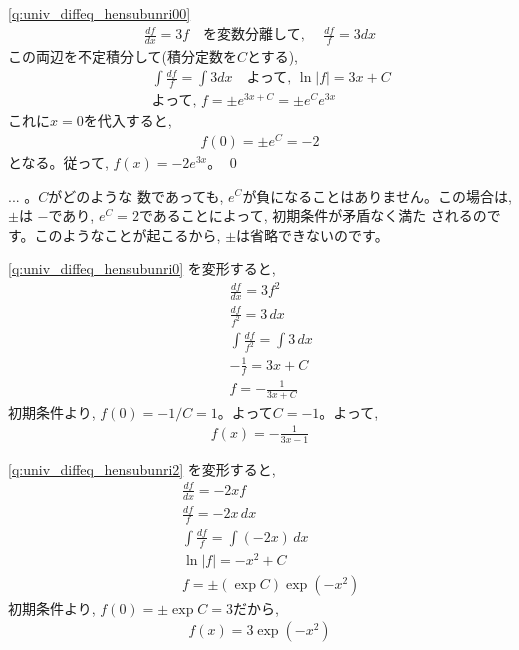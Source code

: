 \ref{q:univ_diffeq_hensubunri00} 
\begin{eqnarray*}
\frac{df}{dx}=3 f\quad
\text{を変数分離して, }\quad
\frac{df}{f}=3 dx\end{eqnarray*}
この両辺を不定積分して(積分定数を$C$とする),
\begin{eqnarray}
&&\int\frac {df}{f} = \int 3 dx\quad\text{よって, }\ln |f| = 3 x + C\nonumber\\
&&\text{よって, }f = \pm e^{3 x + C} = \pm e^C e^{3x}\label{q:univ_diffeq_hensubunri00a3}
\end{eqnarray}
これに$x=0$を代入すると, 
\begin{eqnarray}f(0) = \pm e^C=-2\label{q:univ_diffeq_hensubunri00a5}\end{eqnarray}
となる。従って, $f(x)=-2 e^{3x}$。
\qed
\begin{freqmiss}{\small{} ... 。$C$がどのような
数であっても, $e^C$が負になることはありません。この場合は, $\pm$は
$-$であり, $e^C=2$であることによって, 初期条件が矛盾なく満た
されるのです。このようなことが起こるから, $\pm$は省略できないのです。}\end{freqmiss}
\mv

\ref{q:univ_diffeq_hensubunri0} 
を変形すると, 
\begin{eqnarray}
&&\frac{df}{dx}=3f^2\label{eq:difex41}\\
&&\frac{df}{f^2}=3\,dx\label{eq:difex42}\\
&&\int\frac{df}{f^2}=\int3\,dx\label{eq:difex425}\\
&&-\frac{1}{f}=3x+C\label{eq:difex43}\\
&&f=-\frac{1}{3x+C}\label{eq:difex44}
\end{eqnarray}
初期条件より, $f(0)=-1/C=1$。よって$C=-1$。よって, 
\begin{eqnarray}
f(x)=-\frac{1}{3x-1}\label{eq:difex45}
\end{eqnarray}
\mv

\ref{q:univ_diffeq_hensubunri2} 
を変形すると, 
\begin{eqnarray}
&&\frac{df}{dx}=-2xf\label{eq:difex51}\\
&&\frac{df}{f}=-2x\,dx\label{eq:difex52}\\
&&\int\frac{df}{f}=\int(-2x)\,dx\label{eq:difex525}\\
&&\ln |f|=-x^2+C\label{eq:difex53}\\
&&f=\pm(\exp C) \exp(-x^2)\label{eq:difex54}
\end{eqnarray}
初期条件より, $f(0)=\pm\exp C=3$だから, 
\begin{eqnarray}
f(x)=3\exp(-x^2)\label{eq:difex55}
\end{eqnarray}
\mv





